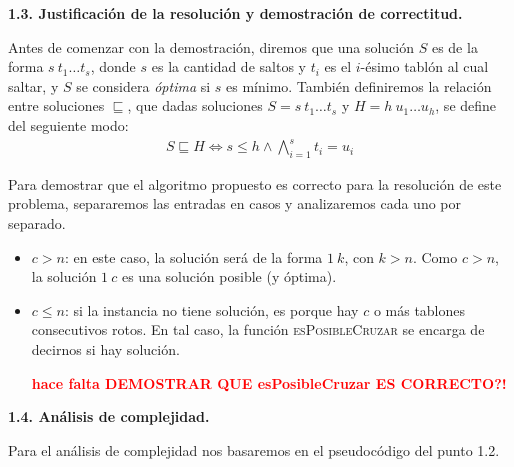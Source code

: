 \vspace*{0.75cm} \noindent



\noindent
\textbf{1.3. Justificación de la resolución y demostración de correctitud.}

\vspace*{0.3cm}

Antes de comenzar con la demostración, diremos que una solución $S$ es de la forma $s \ t_1 \dots t_s$,
donde $s$ es la cantidad de saltos y $t_i$ es el $i$-ésimo tablón al cual saltar, y $S$ se considera
\textit{óptima} si $s$ es mínimo. También definiremos la relación entre soluciones $\sqsubseteq$, que
dadas soluciones $S = s \ t_1 \dots t_s$ y $H = h \ u_1 \dots u_h$, se define del seguiente modo:
\begin{align*}
  S \sqsubseteq H \iff s \leq h \wedge \bigwedge_{i=1}^s t_i = u_i
\end{align*}

Para demostrar que el algoritmo propuesto es correcto para la resolución de este problema, 
separaremos las entradas en casos y analizaremos cada uno por separado.

\begin{itemize}
  \item $c > n$: en este caso, la solución será de la forma $1 \ k$, con $k > n$. Como $c > n$, la 
  solución $1 \ c$ es una solución posible (y óptima).
  
  \item $c \leq n$: si la instancia no tiene solución, es porque hay $c$ o más tablones consecutivos rotos.
  En tal caso, la función \textsc{esPosibleCruzar} se encarga de decirnos si hay solución.
  
  \textcolor{red}{\textbf{hace falta DEMOSTRAR QUE esPosibleCruzar ES CORRECTO?!}}

\end{itemize}


\vspace*{0.75cm} \noindent



\noindent
\textbf{1.4. Análisis de complejidad.}

\vspace*{0.3cm}

Para el análisis de complejidad nos basaremos en el pseudocódigo del punto 1.2.

